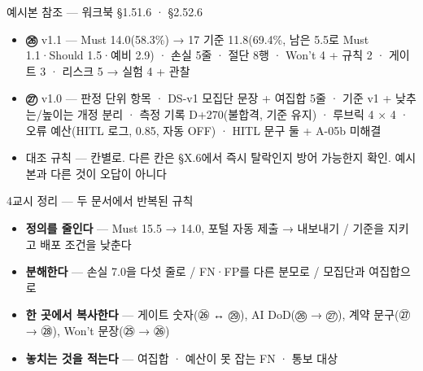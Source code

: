 \begin{frame}{예시본 참조 — 워크북 §1.5\til{}1.6 · §2.5\til{}2.6}
\begin{itemize}
\item \textbf{㉖} v1.1 — Must 14.0(58.3\%) → 17 기준 11.8(69.4\%, 남은 5.5로 Must 1.1·Should 1.5·예비 2.9) · 손실 5줄 · 절단 8행 · Won't 4 + 규칙 2 · 게이트 3 · 리스크 5 → 실험 4 + 관찰
\item \textbf{㉗} v1.0 — 판정 단위 항목 · DS-v1 모집단 문장 + 여집합 5줄 · 기준 v1 + 낮추는/높이는 개정 분리 · 측정 기록 D+270(불합격, 기준 유지) · 루브릭 4 × 4 · 오류 예산(HITL 로그, 0.85, 자동 OFF) · HITL 문구 둘 + A-05b 미해결
\item 대조 규칙 — 칸별로. 다른 칸은 §X.6에서 즉시 탈락인지 방어 가능한지 확인. 예시본과 다른 것이 오답이 아니다
\end{itemize}
\end{frame}

\begin{frame}{4교시 정리 — 두 문서에서 반복된 규칙}
\begin{itemize}
\item \textbf{정의를 줄인다} — Must 15.5 → 14.0, 포털 자동 제출 → 내보내기 / 기준을 지키고 배포 조건을 낮춘다
\item \textbf{분해한다} — 손실 7.0을 다섯 줄로 / FN·FP를 다른 분모로 / 모집단과 여집합으로
\item \textbf{한 곳에서 복사한다} — 게이트 숫자(㉖ ↔ ㉙), AI DoD(㉖ → ㉗), 계약 문구(㉗ → ㉘), Won't 문장(㉕ → ㉖)
\item \textbf{놓치는 것을 적는다} — 여집합 · 예산이 못 잡는 FN · 통보 대상
\end{itemize}
\end{frame}

